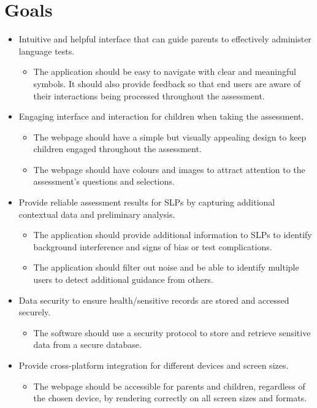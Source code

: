 \documentclass{article}
\begin{document}
\section{Goals}
\begin{itemize}
    \item Intuitive and helpful interface that can guide parents to effectively administer language tests.
    \begin{itemize}
        \item The application should be easy to navigate with clear and meaningful symbols.
        It should also provide feedback so that end users are aware of their interactions being processed throughout the assessment.
    \end{itemize}
    
    \item Engaging interface and interaction for children when taking the assessment.
    \begin{itemize}
        \item The webpage should have a simple but visually appealing design to keep children engaged throughout the assessment.
        \item The webpage should have colours and images to attract attention to the assessment's questions and selections.
    \end{itemize}
    
    \item Provide reliable assessment results for SLPs by capturing additional contextual data and preliminary analysis.
    \begin{itemize}
        \item The application should provide additional information to SLPs to identify background interference and signs of bias or test complications.
        \item The application should filter out noise and be able to identify multiple users to detect additional guidance from others.
    \end{itemize}
    \item Data security to ensure health/sensitive records are stored and accessed securely.
    \begin{itemize}
        \item The software should use a security protocol to store and retrieve sensitive data from a secure database.
    \end{itemize}
    \item Provide cross-platform integration for different devices and screen sizes.
    \begin{itemize}
        \item The webpage should be accessible for parents and children, regardless of the chosen device, by rendering correctly on all screen sizes and formats. 
    \end{itemize}
\end{itemize}
\end{document}
